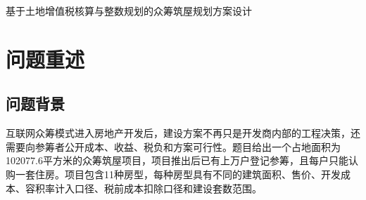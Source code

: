 \documentclass[UTF8,12pt,a4paper]{ctexart}
\begin{document}
\begin{center}
{\heiti{} 基于土地增值税核算与整数规划的众筹筑屋规划方案设计}
\end{center}

\begin{abstract}
众筹筑屋项目需要在容积率、开发成本、税收政策、参筹者购买意愿和投资回报之间取得平衡。本文围绕2015年D题给出的11种房型数据，建立了“房型明细核算—土地增值税分组累进核算—整数规划优化—投资回报率敏感性分析”的完整模型链，对原方案I进行公开核算，并设计满足约束的方案II。

针对问题一，本文将房型面积、套数、售价和开发成本逐项汇总，按是否列入容积率计算计容建筑面积，并依据土地增值税四级超率累进税率，对普通住宅和非普通住宅两类分别核算。结果表明，方案I总套数为2100套，总建筑面积为277025平方米，容积率为2.2752，低于政策上限2.28；销售收入为32.4672亿元，建安成本为13.1439亿元，土地增值税为1.6183亿元，净利润为8.0989亿元，投资回报率为33.24\%。

针对问题二，本文先构造按购买意愿比例分配的baseline，再以房型套数为整数决策变量，建立同时考虑满意度、供应结构偏差、税前盈利和容积率约束的多目标整数规划。优化得到方案II：房型1--11套数分别为50, 354, 50, 150, 100, 349, 450, 100, 50, 197, 250。该方案总建筑面积为296538平方米，容积率为2.2799，满足2.28上限；加权满意得分由方案I的0.5833提高到0.6337，净利润由8.0989亿元提高到8.7956亿元。

针对问题三，本文以25\%投资回报率作为项目成功阈值，对方案II进行税后核算和敏感性分析。方案II投资回报率为34.16\%，高于25\%门槛，因此在题给价格和成本口径下能够成功执行。单因素扰动表明，在售价或建安成本发生较小幅度变化时，ROI仍明显高于成功阈值，模型具有较好的可行性和稳健性。

\textbf{关键词：}众筹筑屋；土地增值税；整数规划；容积率；投资回报率；敏感性分析
\end{abstract}
\newpage
\tableofcontents
\newpage

\section{问题重述}
\subsection{问题背景}
互联网众筹模式进入房地产开发后，建设方案不再只是开发商内部的工程决策，还需要向参筹者公开成本、收益、税负和方案可行性。题目给出一个占地面积为102077.6平方米的众筹筑屋项目，项目推出后已有上万户登记参筹，且每户只能认购一套住房。项目包含11种房型，每种房型具有不同的建筑面积、售价、开发成本、容积率计入口径、税前成本扣除口径和建设套数范围。
\end{document}

